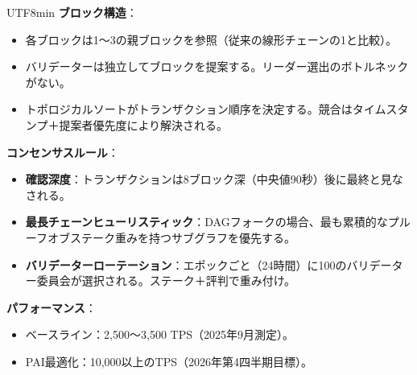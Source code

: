 \documentclass[11pt]{article}
\begin{document}
\begin{CJK}{UTF8}{min}
\textbf{ブロック構造}：
\begin{itemize}[noitemsep]
  \item 各ブロックは1〜3の親ブロックを参照（従来の線形チェーンの1と比較）。
  \item バリデーターは独立してブロックを提案する。リーダー選出のボトルネックがない。
  \item トポロジカルソートがトランザクション順序を決定する。競合はタイムスタンプ＋提案者優先度により解決される。
\end{itemize}

\textbf{コンセンサスルール}：
\begin{itemize}[noitemsep]
  \item \textbf{確認深度}：トランザクションは8ブロック深（中央値90秒）後に最終と見なされる。
  \item \textbf{最長チェーンヒューリスティック}：DAGフォークの場合、最も累積的なプルーフオブステーク重みを持つサブグラフを優先する。
  \item \textbf{バリデーターローテーション}：エポックごと（24時間）に100のバリデーター委員会が選択される。ステーク＋評判で重み付け。
\end{itemize}

\textbf{パフォーマンス}：
\begin{itemize}[noitemsep]
  \item ベースライン：2,500〜3,500 TPS（2025年9月測定）。
  \item PAI最適化：10,000以上のTPS（2026年第4四半期目標）。
\end{itemize}


\end{CJK}
\end{document}
